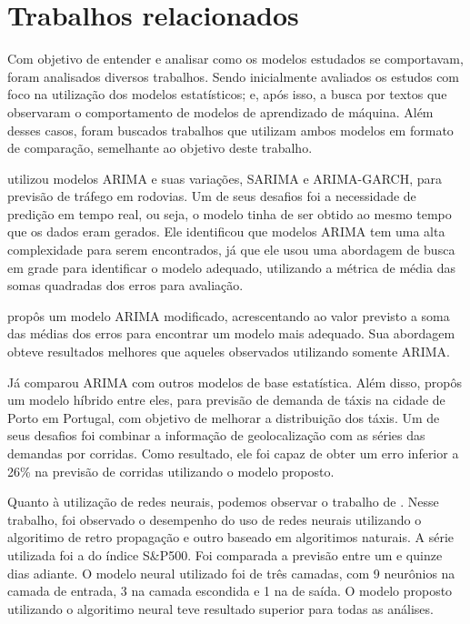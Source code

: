 \documentclass[
    12pt,
    oneside,
    a4paper,
    english,
    brazil
]{abntex2}
\begin{document}
\chapter{Trabalhos relacionados}

Com objetivo de entender e analisar como os modelos estudados se comportavam,
foram analisados diversos trabalhos. Sendo inicialmente avaliados os estudos
com foco na utilização dos modelos estatísticos; e, após isso, a busca por textos
que observaram o comportamento de modelos de aprendizado de máquina. Além
desses casos, foram buscados trabalhos que utilizam ambos modelos em formato de
comparação, semelhante ao objetivo deste trabalho.

   utilizou  modelos   ARIMA  e   suas  variações,   SARIMA  e
ARIMA-GARCH, para  previsão de tráfego em  rodovias. Um de seus  desafios foi a
necessidade de predição em tempo real, ou seja, o modelo tinha de ser obtido ao
mesmo tempo  que os dados eram  gerados. Ele identificou que  modelos ARIMA tem
uma alta complexidade para serem encontrados,  já que ele usou uma abordagem de
busca em  grade para  identificar o  modelo adequado,  utilizando a  métrica de
média das somas quadradas dos erros para avaliação.

  propôs um  modelo  ARIMA modificado, acrescentando ao  valor
previsto a  soma das médias dos  erros para encontrar um  modelo mais adequado.
Sua  abordagem obteve  resultados  melhores que  aqueles observados  utilizando
somente ARIMA\@.

Já  comparou ARIMA com outros modelos de base estatística. Além disso, 
propôs  um modelo  híbrido entre  eles, para  previsão de  demanda de  táxis na
cidade de Porto em Portugal, com objetivo de melhorar a distribuição dos táxis.
Um de seus  desafios foi combinar a informação de  geolocalização com as séries
das  demandas por  corridas. Como  resultado, ele foi  capaz de  obter um  erro
inferior a 26\% na previsão de corridas utilizando o modelo proposto.

Quanto  à  utilização   de  redes  neurais, podemos  observar   o  trabalho  de
.  Nesse trabalho,  foi observado  o desempenho  do uso  de
redes neurais  utilizando o algoritimo de  retro propagação e outro  baseado em
algoritimos naturais. A série utilizada foi  a do índice S\&P500. Foi comparada
a previsão  entre um e  quinze dias adiante. O  modelo neural utilizado  foi de
três camadas, com 9  neurônios na camada de entrada, 3 na  camada escondida e 1
na de  saída. O modelo proposto  utilizando o algoritimo neural  teve resultado
superior para todas as análises.
\end{document}

